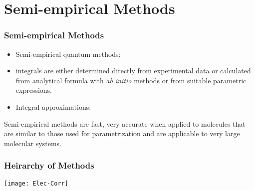 \documentclass[slidestop,mathserif,compress,xcolor=svgnames]{beamer}
\begin{document}
\section{Semi-empirical Methods}
\begin{frame}
\frametitle{\small Semi-empirical Methods}
\footnotesize{
\begin{itemize}
\item Semi-empirical quantum methods: 
\item integrals are either determined directly from experimental data or calculated from analytical formula with \emph{ab initio} methods or from suitable parametric expressions.
\item Integral approximations:
\end{itemize}
\begin{block}{}
Semi-empirical methods are fast, very accurate when applied to molecules that are similar to those used for parametrization and are applicable to very large molecular systems.
\end{block}
}
\end{frame}

\begin{frame}
\frametitle{\small Heirarchy of Methods}
\begin{center}
\vspace{-1cm}
\texttt{[image: Elec-Corr]}%
\end{center}
\end{frame}
\end{document}
